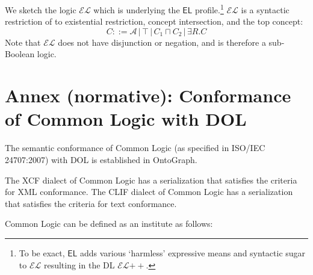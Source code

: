 \documentclass[10pt,%
\ifpretendfinal
final%
\else
draft%
\fi,
]{scrreprt}
\newcommand{\EL}{\ensuremath{\mathsf{EL}}\xspace}
\newcommand{\ELDL}{\ensuremath{\mathcal{EL}}\xspace}
\newcommand{\bref}[1]{[\ref{#1}]}
\newcommand{\nisref}[1]{#1}
\renewcommand{\bref}[1]{#1}
\newcommand{\normannex}[1]{ \chapter{Annex (normative): #1} }
\begin{document}
\begin{definition}
We sketch the logic \ELDL which is underlying the \EL profile.\footnote{To be exact, \EL adds various `harmless' expressive means and syntactic sugar to \ELDL resulting in the DL \ELDL$++$. %
} 
\ELDL is a syntactic restriction of \ALC to existential restriction, concept
intersection, and the top concept:
$$C ::= {\mathcal A} \,|\, \top \,|\,  C_1 \sqcap C_2 \,|\, \exists R . C$$
Note that \ELDL does not have disjunction or negation, and is therefore a sub-Boolean logic.
\end{definition}


\normannex{Conformance of Common Logic with DOL}\label{a:cl}

The semantic conformance of Common Logic (as specified in \nisref{ISO/IEC 24707:2007}) with DOL is established in \bref{OntoGraph}.

The XCF dialect of Common Logic has a serialization that satisfies the criteria for XML conformance.  The CLIF dialect of Common Logic has a serialization that satisfies the criteria for text conformance.

Common Logic can be defined as an institute as follows:
\end{document}
